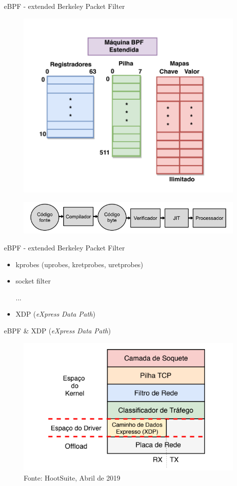 \begin{frame}{eBPF - extended Berkeley Packet Filter}
    \begin{figure}
        \centering
        \includegraphics[width=.55\linewidth]{img/proj_tcc/maquina-ebpf.png}
        \label{figure:facebook}
    \end{figure}
    \begin{figure}
      \centering
      \includegraphics[width=.8\linewidth]{img/proj_tcc/workflow.png}
      \label{figure:cloudflare}
    \end{figure}
\end{frame}

\begin{frame}{eBPF - extended Berkeley Packet Filter}
    \begin{itemize}
        \item kprobes (uprobes, kretprobes, uretprobes)
        \item socket filter
        
        ...
        
        \item XDP (\textit{eXpress Data Path})
    \end{itemize}
\end{frame}

\begin{frame}{eBPF \& XDP (\textit{eXpress Data Path})}
	\begin{figure}
		\caption{}
		\includegraphics[width = 0.65\linewidth]{img/proj_tcc/kernel-network-stack.png}\\
		\tiny Fonte: HootSuite, Abril de 2019
	\end{figure}
\end{frame}

